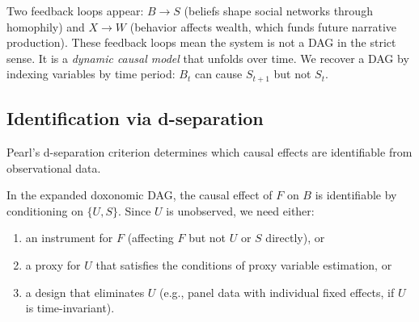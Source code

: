 \begin{center}
\end{center}

Two feedback loops appear: $B \to S$ (beliefs shape social networks through homophily) and $X \to W$ (behavior affects wealth, which funds future narrative production).
These feedback loops mean the system is not a DAG in the strict sense. It is a \emph{dynamic causal model} that unfolds over time.
We recover a DAG by indexing variables by time period: $B_t$ can cause $S_{t+1}$ but not $S_t$.

\subsection{Identification via d-separation}

Pearl's d-separation criterion determines which causal effects are identifiable from observational data.

\begin{proposition}
\label{prop:d-sep}
In the expanded doxonomic DAG, the causal effect of $F$ on $B$ is identifiable by conditioning on $\{U, S\}$.
Since $U$ is unobserved, we need either:
\begin{enumerate}[nosep]
  \item an instrument for $F$ (affecting $F$ but not $U$ or $S$ directly), or
  \item a proxy for $U$ that satisfies the conditions of proxy variable estimation, or
  \item a design that eliminates $U$ (e.g., panel data with individual fixed effects, if $U$ is time-invariant).
\end{enumerate}
\end{proposition}

